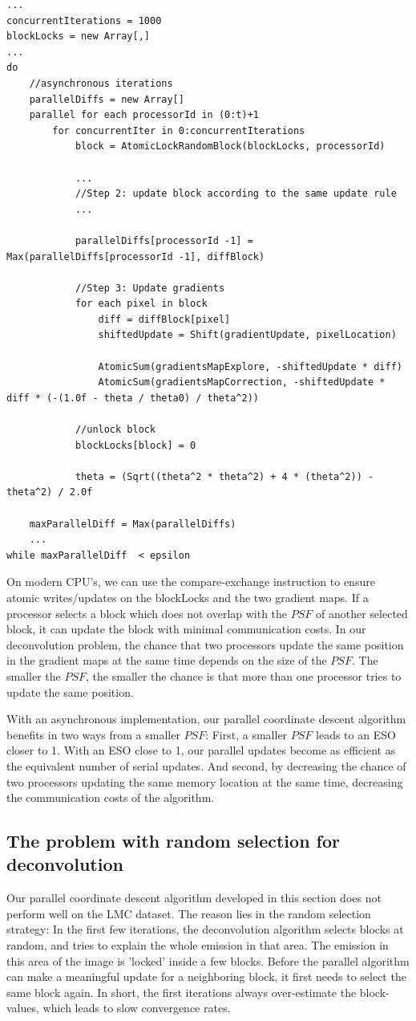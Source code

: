 \begin{lstlisting}
...
concurrentIterations = 1000
blockLocks = new Array[,]
...
do
	//asynchronous iterations
	parallelDiffs = new Array[]
	parallel for each processorId in (0:t)+1
		for concurrentIter in 0:concurrentIterations
			block = AtomicLockRandomBlock(blockLocks, processorId)
			
			...		
			//Step 2: update block according to the same update rule
			...
			
			parallelDiffs[processorId -1] = Max(parallelDiffs[processorId -1], diffBlock)
			
			//Step 3: Update gradients
			for each pixel in block
				diff = diffBlock[pixel]
				shiftedUpdate = Shift(gradientUpdate, pixelLocation)
				
				AtomicSum(gradientsMapExplore, -shiftedUpdate * diff)
				AtomicSum(gradientsMapCorrection, -shiftedUpdate * diff * (-(1.0f - theta / theta0) / theta^2))
			
			//unlock block	
			blockLocks[block] = 0
			
			theta = (Sqrt((theta^2 * theta^2) + 4 * (theta^2)) - theta^2) / 2.0f
			
	maxParallelDiff = Max(parallelDiffs)
	...
while maxParallelDiff  < epsilon
\end{lstlisting}

On modern CPU's, we can use the compare-exchange instruction to ensure atomic writes/updates on the blockLocks and the two gradient maps. If a processor selects a block which does not overlap with the $PSF$ of another selected block, it can update the block with minimal communication costs. In our deconvolution problem, the chance that two processors update the same position in the gradient maps at the same time depends on the size of the $PSF$. The smaller the $PSF$, the smaller the chance is that more than one processor tries to update the same position.

With an asynchronous implementation, our parallel coordinate descent algorithm benefits in two ways from a smaller $PSF$: First, a smaller $PSF$ leads to an ESO closer to 1. With an ESO close to 1, our parallel updates become as efficient as the equivalent number of serial updates. And second, by decreasing the chance of two processors updating the same memory location at the same time, decreasing the communication costs of the algorithm.


\subsection{The problem with random selection for deconvolution} \label{pcdm:adaption}
Our parallel coordinate descent algorithm developed in this section does not perform well on the LMC dataset. The reason lies in the random selection strategy: In the first few iterations, the deconvolution algorithm selects blocks at random, and tries to explain the whole emission in that area. The emission in this area of the image is 'locked' inside a few blocks. Before the parallel algorithm can make a meaningful update for a neighboring block, it first needs to select the same block again. In short, the first iterations always over-estimate the block-values, which leads to slow convergence rates. 

